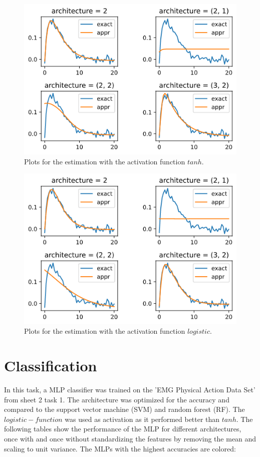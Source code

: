 \documentclass[DIV=12, ngerman, fontsize=12pt, parskip=half]{scrreprt}
\begin{document}
	\begin{figure}[H]
		\begin{center}
			\includegraphics[scale=0.54]{regr_tanh}
			\caption{Plots for the estimation with the activation function $tanh$.}
		\end{center}
	\end{figure}
	\begin{figure}[H]
		\begin{center}
			\includegraphics[scale=0.54]{regr_logistic}
			\caption{Plots for the estimation with the activation function $logistic$.}
		\end{center}
	\end{figure}


	\section{Classification}
	In this task, a MLP classifier was trained on the 'EMG Physical Action Data Set' from sheet 2 task 1. The architecture was optimized for the accuracy and compared to the support vector machine (SVM) and random forest (RF). The $logistic-function$ was used as activation as it performed better than $tanh$. The following tables show the performance of the MLP for different architectures, once with and once without standardizing the features by removing the mean and scaling to unit variance. The MLPs with the highest accuracies are colored:
	
\end{document}
